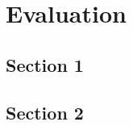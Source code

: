 \chapter{Evaluation}
\label{ch:evaluation}

\section{Section 1}
\lipsum[1]
\section{Section 2}
\lipsum[2]